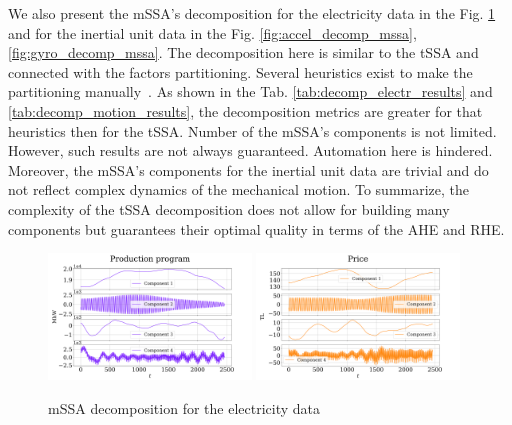 \documentclass[referee, pdflatex, sn-mathphys-num]{sn-jnl}
\theoremstyle{definition}
\theoremstyle{plain}
\begin{document}
	We also present the mSSA's decomposition for the electricity data in the Fig. \ref{fig:electr_decomp_mssa} and for the inertial unit data in the Fig. \ref{fig:accel_decomp_mssa}, \ref{fig:gyro_decomp_mssa}. The decomposition here is similar to the tSSA and connected with the factors partitioning. Several heuristics exist to make the partitioning manually~\cite{ecfb9dc578be43ae9ee8fc88b8ff9151}. As shown in the Tab. \ref{tab:decomp_electr_results} and \ref{tab:decomp_motion_results}, the decomposition metrics are greater for that heuristics then for the tSSA. Number of the mSSA's components is not limited. However, such results are not always guaranteed. Automation here is hindered. Moreover, the mSSA's components for the inertial unit data are trivial and do not reflect complex dynamics of the mechanical motion. To summarize, the complexity of the tSSA decomposition does not allow for building many components but guarantees their optimal quality in terms of the AHE and RHE.
	
	\begin{figure}[h]
		\centering
		\includegraphics[width=0.48\textwidth, keepaspectratio]{Production_program_mssa.png}
		\includegraphics[width=0.48\textwidth, keepaspectratio]{Price_mssa.png}
		\caption{mSSA decomposition for the electricity data}\label{fig:electr_decomp_mssa}
	\end{figure}
	
\end{document}
